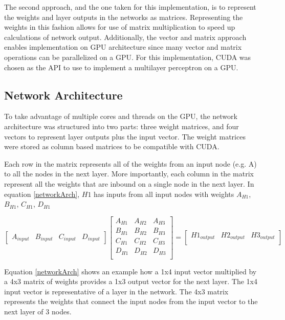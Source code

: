 \documentclass[jair, twoside,11pt,theapa]{article}
\begin{document}
The second approach, and the one taken for this implementation, is to represent the weights and layer outputs in the networks as matrices. 
Representing the weights in this fashion allows for use of matrix multiplication to speed up calculations of network output. 
Additionally, the vector and matrix approach enables implementation on GPU architecture since many vector and matrix operations can be parallelized on a GPU. 
For this implementation, CUDA was chosen as the API to use to implement a multilayer perceptron on a GPU. 

\subsection{Network Architecture}
\label{Network Arch Section}
To take advantage of multiple cores and threads on the GPU, the network architecture was structured into two parts: three weight matrices, and four vectors to represent layer outputs plus the input vector. 
The weight matrices were stored as column based matrices to be compatible with CUDA. 

Each row in the matrix represents all of the weights from an input node (e.g. A) to all the nodes in the next layer. 
More importantly, each column in the matrix represent all the weights that are inbound on a single node in the next layer. 
In equation \ref{networkArch}, $H1$ has inputs from all input nodes with weights $A_{H1}$, $B_{H1}$, $C_{H1}$, $D_{H1}$

\begin{equation}
\label{networkArch}
\left[
\begin{array}{cccc}
A_{input} & B_{input} & C_{input} & D_{input}
\end{array} 
\right]
%
\left[
\begin{array}{ccc}
A_{H1} & A_{H2} & A_{H3} \\
B_{H1} & B_{H2} & B_{H3} \\
C_{H1} & C_{H2} & C_{H3} \\
D_{H1} & D_{H2} & D_{H3} \\
\end{array} 
\right]
% 
= 
\left[
\begin{array}{ccc}
H1_{output} & H2_{output} & H3_{output} \\
\end{array} 
\right]
\end{equation}

Equation \ref{networkArch} shows an example how a 1x4 input vector multiplied by a 4x3 matrix of weights provides a 1x3 output vector for the next layer. 
The 1x4 input vector is representative of a layer in the network.
The 4x3 matrix represents the weights that connect the input nodes from the input vector to the next layer of 3 nodes. 
\end{document}
